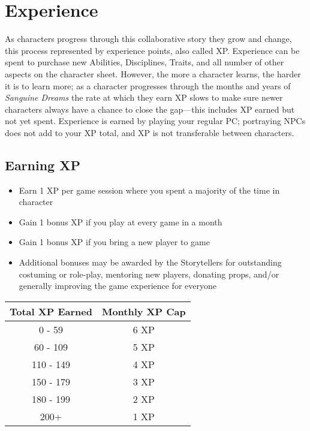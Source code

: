 \section{Experience}
\label{sec:xp}
As characters progress through this collaborative story they grow and change, 
this process represented by experience points, also called XP.  Experience can 
be spent to purchase new Abilities, Disciplines, Traits, and all number of other 
aspects on the character sheet.  However, the more a character learns, the harder 
it is to learn more; as a character progresses through the months and years of 
\emph{Sanguine Dreams} the rate at which they earn XP slows to make sure newer 
characters always have a chance to close the gap---this includes XP earned but not 
yet spent.  Experience is earned by playing your regular PC; portraying NPCs does not 
add to your XP total, and XP is not transferable between characters.

\subsection{Earning XP}
\begin{itemize}
	\item Earn 1 XP per game session where you spent a majority of the time in character
	\item Gain 1 bonus XP if you play at every game in a month
	\item Gain 1 bonus XP if you bring a new player to game
	\item Additional bonuses may be awarded by the Storytellers for outstanding 
	costuming or role-play, mentoring new players, donating props, and/or 
	generally improving the game experience for everyone
\end{itemize}

\begin{center}
\begin{tabular}{ | c | c | }
	\hline
	\textbf{Total XP Earned} & \textbf{Monthly XP Cap} \\
	\hline
	0 - 59 & 6 XP \\
	60 - 109 & 5 XP \\
	110 - 149 & 4 XP \\
	150 - 179 & 3 XP \\
	180 - 199 & 2 XP \\
	200+ & 1 XP \\
	\hline
\end{tabular}
\end{center}

